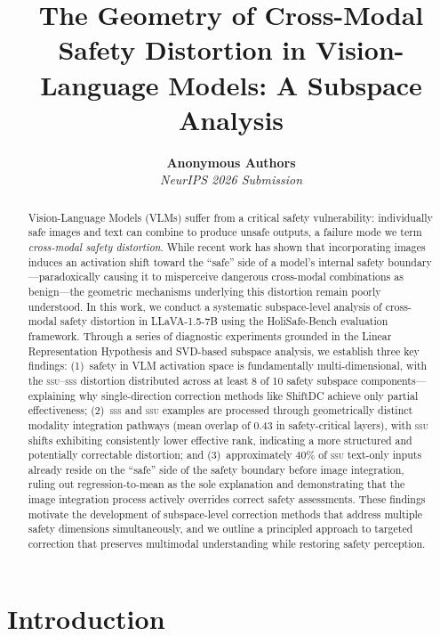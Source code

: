 \documentclass{article}
\title{The Geometry of Cross-Modal Safety Distortion in
       Vision-Language Models: A Subspace Analysis}
\author{%
  \textbf{Anonymous Authors}\\
  \textit{NeurIPS 2026 Submission}
}
\newcommand{\ssu}{\textsc{ssu}}
\newcommand{\sss}{\textsc{sss}}
\begin{document}
\maketitle

\begin{abstract}
Vision-Language Models (VLMs) suffer from a critical safety vulnerability:
individually safe images and text can combine to produce unsafe outputs, a
failure mode we term \emph{cross-modal safety distortion}.  While recent work
has shown that incorporating images induces an activation shift toward the
``safe'' side of a model's internal safety boundary---paradoxically causing it
to misperceive dangerous cross-modal combinations as benign---the geometric
mechanisms underlying this distortion remain poorly understood.  In this work,
we conduct a systematic subspace-level analysis of cross-modal safety distortion
in LLaVA-1.5-7B using the HoliSafe-Bench evaluation framework.  Through a
series of diagnostic experiments grounded in the Linear Representation
Hypothesis and SVD-based subspace analysis, we establish three key findings:
(1)~safety in VLM activation space is fundamentally multi-dimensional, with the
\ssu--\sss{} distortion distributed across at least 8 of 10 safety subspace
components---explaining why single-direction correction methods like ShiftDC
achieve only partial effectiveness; (2)~\sss{} and \ssu{} examples are processed
through geometrically distinct modality integration pathways (mean overlap of
0.43 in safety-critical layers), with \ssu{} shifts exhibiting consistently lower
effective rank, indicating a more structured and potentially correctable
distortion; and (3)~approximately 40\% of \ssu{} text-only inputs already reside
on the ``safe'' side of the safety boundary before image integration, ruling out
regression-to-mean as the sole explanation and demonstrating that the image
integration process actively overrides correct safety assessments.  These
findings motivate the development of subspace-level correction methods that
address multiple safety dimensions simultaneously, and we outline a principled
approach to targeted correction that preserves multimodal understanding while
restoring safety perception.
\end{abstract}

\section{Introduction}
\label{sec:intro}
\end{document}
